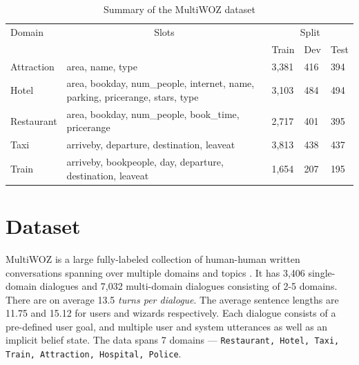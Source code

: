 \documentclass[12pt,a4paper]{article}
\begin{document}
\begin{table}[!ht]
  \caption{Summary of the MultiWOZ dataset}
  \centering
  \begin{tabularx}{\textwidth}{lp{10cm}lll}
    \toprule
    \multicolumn{1}{l}{Domain} & \multicolumn{1}{c}{Slots}                                                    & \multicolumn{3}{c}{Split}              \\
    \cmidrule(l){3-5}
                               &                                                                              & Train                     & Dev & Test \\
    \midrule
    Attraction                 & area, name, type                                                             & 3,381                     & 416 & 394  \\
    Hotel                      & area, bookday, num\_people, internet, name, parking, pricerange, stars, type & 3,103                     & 484 & 494  \\
    Restaurant                 & area, bookday, num\_people, book\_time, pricerange                           & 2,717                     & 401 & 395  \\
    Taxi                       & arriveby, departure, destination, leaveat                                    & 3,813                     & 438 & 437  \\
    Train                      & arriveby, bookpeople, day, departure, destination, leaveat                   & 1,654                     & 207 & 195  \\
    \bottomrule
  \end{tabularx}
\end{table}

\section{Dataset}

MultiWOZ is a large fully-labeled collection of human-human written conversations spanning over multiple domains and topics \cite{Budzianowski2018MultiWOZA}. It has 3,406 single-domain dialogues and 7,032 multi-domain dialogues consisting of 2-5 domains. There are on average 13.5 \textit{turns per dialogue}. The average sentence lengths are 11.75 and 15.12 for users and wizards respectively. Each dialogue consists of a pre-defined user goal, and multiple user and system utterances as well as an implicit belief state. The data spans 7 domains --- \texttt{Restaurant, Hotel, Taxi, Train, Attraction, Hospital, Police}.
\end{document}

